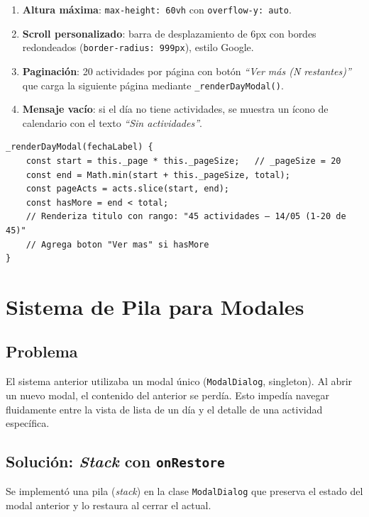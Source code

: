 \documentclass[12pt,a4paper]{article}
\begin{document}
\begin{enumerate}[leftmargin=*]
    \item \textbf{Altura máxima}: \texttt{max-height: 60vh} con \texttt{overflow-y: auto}.
    \item \textbf{Scroll personalizado}: barra de desplazamiento de 6px con bordes redondeados (\texttt{border-radius: 999px}), estilo Google.
    \item \textbf{Paginación}: 20 actividades por página con botón \textit{``Ver más (N restantes)''} que carga la siguiente página mediante \texttt{\_renderDayModal()}.
    \item \textbf{Mensaje vacío}: si el día no tiene actividades, se muestra un ícono de calendario con el texto \textit{``Sin actividades''}.
\end{enumerate}

\begin{lstlisting}[caption={Paginación en modal de día}, label=lst:pagination]
_renderDayModal(fechaLabel) {
    const start = this._page * this._pageSize;   // _pageSize = 20
    const end = Math.min(start + this._pageSize, total);
    const pageActs = acts.slice(start, end);
    const hasMore = end < total;
    // Renderiza titulo con rango: "45 actividades — 14/05 (1-20 de 45)"
    // Agrega boton "Ver mas" si hasMore
}
\end{lstlisting}

\section{Sistema de Pila para Modales}

\subsection{Problema}

El sistema anterior utilizaba un modal único (\texttt{ModalDialog}, singleton). Al abrir un nuevo modal, el contenido del anterior se perdía. Esto impedía navegar fluidamente entre la vista de lista de un día y el detalle de una actividad específica.

\subsection{Solución: \textit{Stack} con \texttt{onRestore}}

Se implementó una pila (\textit{stack}) en la clase \texttt{ModalDialog} que preserva el estado del modal anterior y lo restaura al cerrar el actual.
\end{document}
